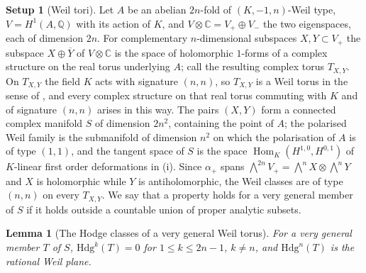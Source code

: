 \documentclass[11pt,reqno]{amsart}
\theoremstyle{plain}
\newtheorem{lemma}[theorem]{Lemma}
\theoremstyle{definition}
\newtheorem{setupenv}[theorem]{Setup}
\theoremstyle{remark}
\newcommand{\QQ}{\mathbb{Q}}
\newcommand{\CC}{\mathbb{C}}
\newcommand{\Hdg}{\mathrm{Hdg}}
\DeclareMathOperator{\Hom}{Hom}
\newcommand{\bbar}[1]{\overline{#1}}
\begin{document}
\begin{setupenv}[Weil tori]\label{setup:weiltori}
Let $A$ be an abelian $2n$-fold of $(K,-1,n)$-Weil type, $V=H^{1}(A,\QQ)$ with
its action of $K$, and $V\otimes\CC=V_{+}\oplus V_{-}$ the two eigenspaces,
each of dimension $2n$. For complementary $n$-dimensional subspaces
$X,Y\subset V_{+}$ the subspace $X\oplus\bbar{Y}$ of $V\otimes\CC$ is the
space of holomorphic $1$-forms of a complex structure on the real torus
underlying $A$; call the resulting complex torus $T_{X,Y}$. On $T_{X,Y}$ the
field $K$ acts with signature $(n,n)$, so $T_{X,Y}$ is a Weil torus in the
sense of \cite{Voi02b}, and every complex structure on that real torus
commuting with $K$ and of signature $(n,n)$ arises in this way. The pairs
$(X,Y)$ form a connected complex manifold $S$ of dimension $2n^{2}$,
containing the point of $A$; the polarised Weil family is the submanifold of
dimension $n^{2}$ on which the polarisation of $A$ is of type $(1,1)$, and the
tangent space of $S$ is the space $\Hom_{K}(H^{1,0},H^{0,1})$ of $K$-linear
first order deformations in (i). Since
$\alpha_{+}$ spans $\bigwedge^{2n}V_{+}=\bigwedge^{n}X\otimes\bigwedge^{n}Y$
and $X$ is holomorphic while $Y$ is antiholomorphic, the Weil classes are of
type $(n,n)$ on every $T_{X,Y}$. We say that a property holds for a very
general member of $S$ if it holds outside a countable union of proper
analytic subsets.
\end{setupenv}

\begin{lemma}[The Hodge classes of a very general Weil torus]
\label{lem:weiltorushodge}
For a very general member $T$ of $S$, $\Hdg^{k}(T)=0$ for
$1\le k\le2n-1$, $k\ne n$, and $\Hdg^{n}(T)$ is the rational Weil plane.
\end{lemma}
\end{document}
